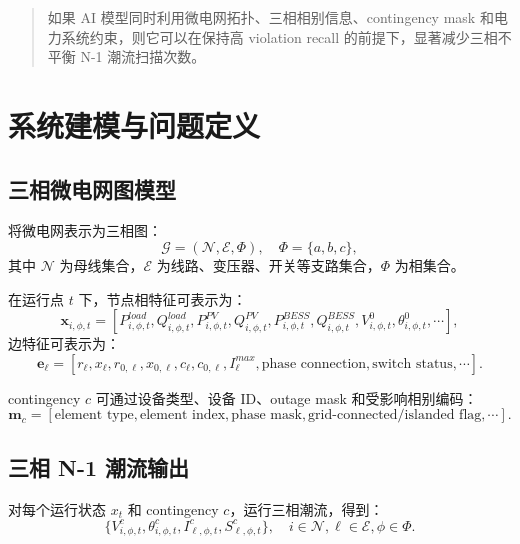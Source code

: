 \documentclass[UTF8,11pt]{ctexart}
\begin{document}
\begin{quote}
如果 AI 模型同时利用微电网拓扑、三相相别信息、contingency mask 和电力系统约束，则它可以在保持高 violation recall 的前提下，显著减少三相不平衡 N-1 潮流扫描次数。
\end{quote}

\section{系统建模与问题定义}

\subsection{三相微电网图模型}

将微电网表示为三相图：
\begin{equation}
    \mathcal{G} = (\mathcal{N}, \mathcal{E}, \Phi), \quad \Phi = \{a,b,c\},
\end{equation}
其中 $\mathcal{N}$ 为母线集合，$\mathcal{E}$ 为线路、变压器、开关等支路集合，$\Phi$ 为相集合。

在运行点 $t$ 下，节点相特征可表示为：
\begin{equation}
    \bm{x}_{i,\phi,t} = [P^{load}_{i,\phi,t}, Q^{load}_{i,\phi,t}, P^{PV}_{i,\phi,t}, Q^{PV}_{i,\phi,t}, P^{BESS}_{i,\phi,t}, Q^{BESS}_{i,\phi,t}, V^{0}_{i,\phi,t}, \theta^{0}_{i,\phi,t}, \cdots],
\end{equation}
边特征可表示为：
\begin{equation}
    \bm{e}_{\ell} = [r_{\ell}, x_{\ell}, r_{0,\ell}, x_{0,\ell}, c_{\ell}, c_{0,\ell}, I^{max}_{\ell}, \text{phase connection}, \text{switch status}, \cdots].
\end{equation}

contingency $c$ 可通过设备类型、设备 ID、outage mask 和受影响相别编码：
\begin{equation}
    \bm{m}_c = [\text{element type}, \text{element index}, \text{phase mask}, \text{grid-connected/islanded flag}, \cdots].
\end{equation}

\subsection{三相 N-1 潮流输出}

对每个运行状态 $x_t$ 和 contingency $c$，运行三相潮流，得到：
\begin{equation}
    \{V^{c}_{i,\phi,t}, \theta^{c}_{i,\phi,t}, I^{c}_{\ell,\phi,t}, S^{c}_{\ell,\phi,t}\}, \quad i \in \mathcal{N}, \ell \in \mathcal{E}, \phi \in \Phi.
\end{equation}
\end{document}
